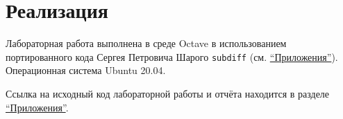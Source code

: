 \section{Реализация}

Лабораторная работа выполнена в среде Octave в использованием портированного кода Сергея Петровича Шарого \texttt{subdiff} (см. \hyperref[app]{``Приложения''}). Операционная система Ubuntu 20.04.

Ссылка на исходный код лабораторной работы и отчёта находится в разделе \hyperref[app]{``Приложения''}.